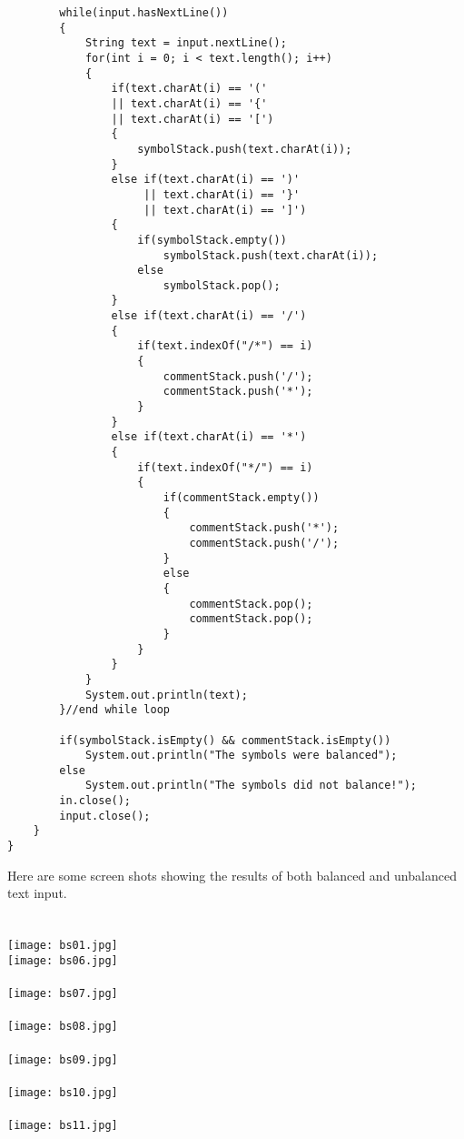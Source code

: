 \documentclass[12pt,letterpaper]{article}
\begin{document}
\begin{verbatim}
        while(input.hasNextLine())
        {
            String text = input.nextLine();
            for(int i = 0; i < text.length(); i++)
            {
                if(text.charAt(i) == '(' 
                || text.charAt(i) == '{' 
                || text.charAt(i) == '[')
                {
                    symbolStack.push(text.charAt(i));
                }
                else if(text.charAt(i) == ')' 
                     || text.charAt(i) == '}' 
                     || text.charAt(i) == ']')
                {
                    if(symbolStack.empty())
                        symbolStack.push(text.charAt(i));
                    else
                        symbolStack.pop();
                }
                else if(text.charAt(i) == '/')
                {
                    if(text.indexOf("/*") == i)
                    {
                        commentStack.push('/');
                        commentStack.push('*');
                    }
                }
                else if(text.charAt(i) == '*')
                {
                    if(text.indexOf("*/") == i)
                    {
                        if(commentStack.empty())
                        {
                        	commentStack.push('*');
                        	commentStack.push('/');
                        }
                        else
                        {
                            commentStack.pop();
                            commentStack.pop();                        
                        }
                    }
                }
            }
            System.out.println(text);
        }//end while loop
		
        if(symbolStack.isEmpty() && commentStack.isEmpty())
            System.out.println("The symbols were balanced");
        else
            System.out.println("The symbols did not balance!");
        in.close();
        input.close();
    }
}
\end{verbatim}
\small
Here are some screen shots showing the results of both balanced and unbalanced text input.\\\\\\
\texttt{[image: bs01.jpg]}\\
\newpage
\texttt{[image: bs06.jpg]}\\\\
\texttt{[image: bs07.jpg]}\\\\
\texttt{[image: bs08.jpg]}\\\\
\texttt{[image: bs09.jpg]}\\\\
\texttt{[image: bs10.jpg]}\\\\
\texttt{[image: bs11.jpg]}\\\\
\newpage
\end{document}
